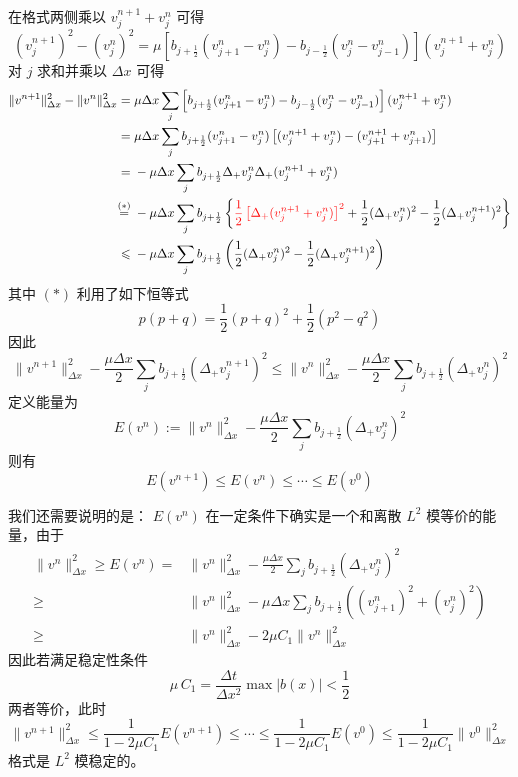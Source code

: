\begin{solution*}
    在格式两侧乘以 $v_j^{n+1} + v_j^n$ 可得
    \[
        (v_j^{n+1})^2 - (v_j^n)^2 = \mu \left[ b_{j+\frac12} (v_{j+1}^n - v_j^{n})
        - b_{j-\frac12} (v_{j}^n - v_{j-1}^{n})\right](v_j^{n+1} + v_j^n)
    \]
    对 $j$ 求和并乘以 $\Delta x$ 可得
    \begin{align*}
        \|v^{n+1}\|_{\Delta x}^2 - \|v^{n}\|_{\Delta x}^2
        ={}                & \mu \Delta x \sum_j \left[ b_{j+\frac12} (v_{j+1}^n - v_j^{n})
        - b_{j-\frac12} (v_{j}^n - v_{j-1}^{n})\right](v_j^{n+1} + v_j^n)
        \\
        ={}                & \mu \Delta x \sum_j b_{j+\frac12} (v_{j+1}^n - v_j^{n})
        \left[(v_j^{n+1} + v_j^n) - (v_{j+1}^{n+1} + v_{j+1}^n)\right]
        \\
        ={}                & - \mu \Delta x \sum_j b_{j+\frac12} \Delta_+ v_j^n \Delta_+(v_j^{n+1}+v_j^n)
        \\
        \overset{(*)}{=}{} & - \mu \Delta x \sum_j b_{j+\frac12}
        \left\{
        {\color{red}\frac12 \left[\Delta_+(v_j^{n+1}+v_j^n)\right]^2}
        + \frac12  (\Delta_+ v_j^n)^2  - \frac12  (\Delta_+ v_j^{n+1})^2
        \right\}
        \\
        \le{}              & - \mu \Delta x \sum_j b_{j+\frac12}
        \left(
        \frac12  (\Delta_+ v_j^n)^2  - \frac12  (\Delta_+ v_j^{n+1})^2
        \right)
    \end{align*}
    其中 $(*)$ 利用了如下恒等式
    \[
        p(p+q) = \frac12(p+q)^2 + \frac12(p^2-q^2)
    \]
    因此
    \[
        \|v^{n+1}\|_{\Delta x}^2 - \frac{\mu \Delta x}2 \sum_j b_{j+\frac12}
        (\Delta_+ v_j^{n+1})^2
        \le
        \|v^{n}\|_{\Delta x}^2 - \frac{\mu \Delta x}2 \sum_j b_{j+\frac12}
        (\Delta_+ v_j^{n})^2
    \]
    定义能量为
    \[
        E(v^n) := \|v^{n}\|_{\Delta x}^2 - \frac{\mu \Delta x}2 \sum_j b_{j+\frac12}
        (\Delta_+ v_j^{n})^2
    \]
    则有
    \[
        E(v^{n+1}) \le E(v^n) \le \cdots \le E(v^0)
    \]

    我们还需要说明的是： $E(v^n)$ 在一定条件下确实是一个和离散 $L^2$ 模等价的能量，由于
    \begin{align*}
        \|v^{n}\|_{\Delta x}^2 \ge{}
        E(v^n) ={} & \|v^{n}\|_{\Delta x}^2 - \frac{\mu \Delta x}2 \sum_j b_{j+\frac12}
        (\Delta_+ v_j^{n})^2                                                            \\
        \ge{}      & \|v^{n}\|_{\Delta x}^2 -  \mu \Delta x  \sum_j b_{j+\frac12}
        ((v_{j+1}^{n})^2 + (v_{j}^{n})^2)                                               \\
        \ge{}      & \|v^{n}\|_{\Delta x}^2 -  2\mu C_1
        \|v^{n}\|_{\Delta x}^2
    \end{align*}
    因此若满足稳定性条件
    \[
        \mu\, C_1 = \frac{\Delta t}{\Delta x^2} \max | b(x)| < \frac12
    \]
    两者等价，此时
    \[
        \|v^{n+1}\|_{\Delta x}^2 \le \frac{1}{1-2\mu C_1} E(v^{n+1}) \le \cdots \le \frac{1}{1-2\mu C_1}E(v^{0})
        \le \frac{1}{1-2\mu C_1} \|v^{0}\|_{\Delta x}^2
    \]
    格式是 $L^2$ 模稳定的。
\end{solution*}

